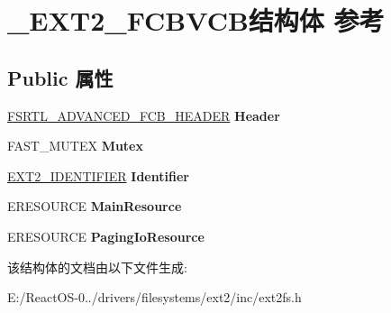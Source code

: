 \hypertarget{struct___e_x_t2___f_c_b_v_c_b}{}\section{\+\_\+\+E\+X\+T2\+\_\+\+F\+C\+B\+V\+C\+B结构体 参考}
\label{struct___e_x_t2___f_c_b_v_c_b}
\subsection*{Public 属性}
\begin{DoxyCompactItemize}
\item 
\mbox{\label{struct___e_x_t2___f_c_b_v_c_b_ae24218438b393964ba26944decd428b8}} 
\hyperlink{struct___f_s_r_t_l___a_d_v_a_n_c_e_d___f_c_b___h_e_a_d_e_r}{F\+S\+R\+T\+L\+\_\+\+A\+D\+V\+A\+N\+C\+E\+D\+\_\+\+F\+C\+B\+\_\+\+H\+E\+A\+D\+ER} {\bfseries Header}
\item 
\mbox{\label{struct___e_x_t2___f_c_b_v_c_b_a7c930f5c3cd211e46411ebd4d342a72f}} 
F\+A\+S\+T\+\_\+\+M\+U\+T\+EX {\bfseries Mutex}
\item 
\mbox{\label{struct___e_x_t2___f_c_b_v_c_b_a49c6664731ad117ede16f6eb827e70ff}} 
\hyperlink{struct___e_x_t2___i_d_e_n_t_i_f_i_e_r}{E\+X\+T2\+\_\+\+I\+D\+E\+N\+T\+I\+F\+I\+ER} {\bfseries Identifier}
\item 
\mbox{\label{struct___e_x_t2___f_c_b_v_c_b_a1e6531e962da55243023b4e067d29597}} 
E\+R\+E\+S\+O\+U\+R\+CE {\bfseries Main\+Resource}
\item 
\mbox{\label{struct___e_x_t2___f_c_b_v_c_b_a9a8591a8f7a924d2165ee23888990acd}} 
E\+R\+E\+S\+O\+U\+R\+CE {\bfseries Paging\+Io\+Resource}
\end{DoxyCompactItemize}


该结构体的文档由以下文件生成\+:\begin{DoxyCompactItemize}
\item 
E\+:/\+React\+O\+S-\/0../drivers/filesystems/ext2/inc/ext2fs.\+h\end{DoxyCompactItemize}
